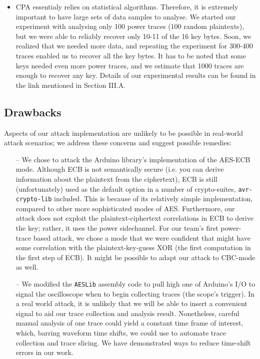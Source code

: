 \documentclass[journal]{ieee_style}
\begin{document}
\begin{itemize}
\item CPA essentialy relies on statistical algorithms. Therefore, it is extremely important to have large sets of data samples to analyse. We started our experiment with analysing only 100 power traces (100 random plaintexts), but we were able to reliably recover only 10-11 of the 16 key bytes. Soon, we realized that we needed more data, and repeating the experiment for 300-400 traces enabled us to recover all the key bytes. It has to be noted that some keys needed even more power traces, and we estimate that 1000 traces are enough to recover any key. Details of our experimental results can be found in the link mentioned in Section III.A.
\end{itemize}

\subsection{Drawbacks}
Aspects of our attack implementation are unlikely to be possible in real-world attack scenarios; we address these concerns and suggest possible remedies:
\begin{itemize}
    \item[--] We chose to attack the Arduino library's implementation of the AES-ECB mode. Although ECB is not semantically secure (i.e. you can derive information about the plaintext from the ciphertext), ECB is still (unfortunately) used as the default option in a number of crypto-suites, \texttt{avr-crypto-lib} included. This is because of its relatively simple implementation, compared to other more sophisticated modes of AES. Furthermore, our attack does not exploit the plaintext-ciphertext correlations in ECB to derive the key; rather, it uses the power sidechannel. For our team's first power-trace based attack, we chose a mode that we were confident that might have some correlation with the plaintext-key-guess XOR (the first computation in the first step of ECB). It might be possible to adapt our attack to CBC-mode as well.
    \item[--] We modified the \texttt{AESLib} assembly code to pull high one of Arduino's I/O to signal the oscilloscope when to begin collecting traces (the scope's trigger). In a real world attack, it is unlikely that we will be able to insert a convenient signal to aid our trace collection and analysis result. Nonetheless, careful manual analysis of one trace could yield a constant time frame of interest, which, barring waveform time shifts, we could use to automate trace collection and trace slicing. We have demonstrated ways to reduce time-shift errors in our work.
\end{itemize}
\end{document}
